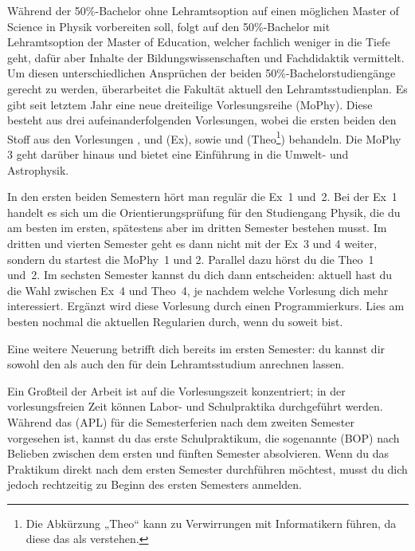 Während der 50\%-Bachelor ohne Lehramtsoption auf einen möglichen Master of Science in Physik vorbereiten soll, folgt auf den 50\%-Bachelor mit Lehramtsoption der Master of Education, welcher fachlich weniger in die Tiefe geht, dafür aber Inhalte der Bildungswissenschaften und Fachdidaktik vermittelt. Um diesen unterschiedlichen Ansprüchen der beiden 50\%-Bachelorstudiengänge gerecht zu werden, überarbeitet die Fakultät aktuell den Lehramtsstudienplan. Es gibt seit letztem Jahr eine neue dreiteilige Vorlesungsreihe  (\gls{MoPhy}). Diese besteht aus drei aufeinanderfolgenden Vorlesungen, wobei die ersten beiden den Stoff aus den Vorlesungen ,  und  (\gls{Ex}), sowie  und  (\gls{Theo}\footnote{Die Abkürzung „Theo“ kann zu Verwirrungen mit Informatikern führen, da diese das als  verstehen.}) behandeln. Die \gls{MoPhy} 3 geht darüber hinaus und bietet eine Einführung in die Umwelt- und Astrophysik.

In den ersten beiden Semestern hört man regulär die Ex~1 und~2. Bei der Ex~1 handelt es sich um die Orientierungsprüfung für den Studiengang Physik, die du am besten im ersten, spätestens aber im dritten Semester bestehen musst. Im dritten und vierten Semester geht es dann nicht mit der Ex~3 und 4 weiter, sondern du startest die MoPhy~1 und 2. Parallel dazu hörst du die Theo~1 und~2. Im sechsten Semester kannst du dich dann entscheiden: aktuell hast du die Wahl zwischen Ex~4 und Theo~4, je nachdem welche Vorlesung dich mehr interessiert. Ergänzt wird diese Vorlesung durch einen Programmierkurs. Lies am besten nochmal die aktuellen Regularien durch, wenn du soweit bist.

Eine weitere Neuerung betrifft dich bereits im ersten Semester: du kannst dir sowohl den  als auch den  für dein Lehramtsstudium anrechnen lassen. 

Ein Großteil der Arbeit ist auf die Vorlesungszeit konzentriert; in der vorlesungsfreien Zeit können Labor- und Schulpraktika durchgeführt werden. Während das  (APL) für die Semesterferien nach dem zweiten Semester vorgesehen ist, kannst du das erste Schulpraktikum, die sogenannte  (\gls{BOP}) nach Belieben zwischen dem ersten und fünften Semester absolvieren. Wenn du das Praktikum direkt nach dem ersten Semester durchführen möchtest, musst du dich jedoch rechtzeitig zu Beginn des ersten Semesters anmelden.


